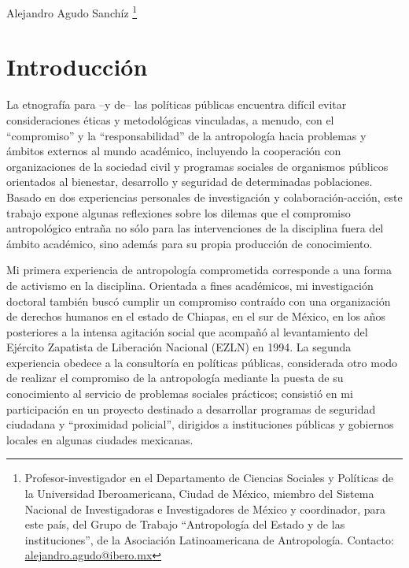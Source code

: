 \documentclass[
  spanish,
  11pt,
  a4paper,
]{scrbook}
\begin{document}

\begin{flushright}
\Large Alejandro Agudo Sanchíz \footnote{Profesor-investigador en el Departamento de Ciencias Sociales y Políticas de la Universidad Iberoamericana, Ciudad de México, miembro del Sistema Nacional de Investigadoras e Investigadores de México y coordinador, para este país, del Grupo de Trabajo “Antropología del Estado y de las instituciones”, de la Asociación Latinoamericana de Antropología. Contacto: \href{alejandro.agudo@ibero.mx}{alejandro.agudo@ibero.mx}}
\end{flushright}

\section*{Introducción}\label{introducciuxf3n-3}


La etnografía para --y de-- las políticas públicas encuentra difícil
evitar consideraciones éticas y metodológicas vinculadas, a menudo, con
el ``compromiso'' y la ``responsabilidad'' de la antropología hacia
problemas y ámbitos externos al mundo académico, incluyendo la
cooperación con organizaciones de la sociedad civil y programas sociales
de organismos públicos orientados al bienestar, desarrollo y seguridad
de determinadas poblaciones. Basado en dos experiencias personales de
investigación y colaboración-acción, este trabajo expone algunas
reflexiones sobre los dilemas que el compromiso antropológico entraña no
sólo para las intervenciones de la disciplina fuera del ámbito
académico, sino además para su propia producción de conocimiento.

Mi primera experiencia de antropología comprometida corresponde a una
forma de activismo en la disciplina. Orientada a fines académicos, mi
investigación doctoral también buscó cumplir un compromiso contraído con
una organización de derechos humanos en el estado de Chiapas, en el sur
de México, en los años posteriores a la intensa agitación social que
acompañó al levantamiento del Ejército Zapatista de Liberación Nacional
(EZLN) en 1994. La segunda experiencia obedece a la consultoría en
políticas públicas, considerada otro modo de realizar el compromiso de
la antropología mediante la puesta de su conocimiento al servicio de
problemas sociales prácticos; consistió en mi participación en un
proyecto destinado a desarrollar programas de seguridad ciudadana y
``proximidad policial'', dirigidos a instituciones públicas y gobiernos
locales en algunas ciudades mexicanas.
\end{document}
